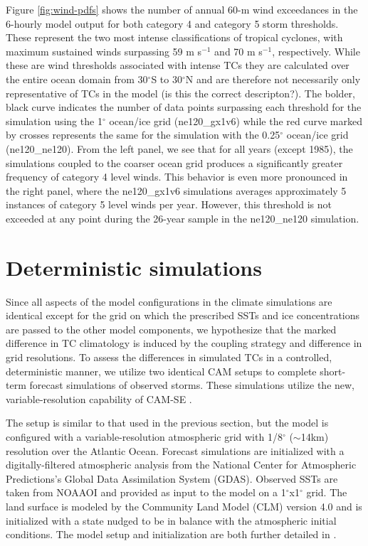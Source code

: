 \documentclass[draft,ms]{AGUTeX}
\newcommand{\degree}{$^{\circ}$}
\newcommand{\texttilde}{$\sim$}
\begin{document}
\begin{article}
Figure \ref{fig:wind-pdfs} shows the number of annual 60-m wind exceedances in the 6-hourly model output for both category 4 and category 5 storm thresholds. These represent the two most intense classifications of tropical cyclones, with maximum sustained winds surpassing 59 m s$^{-1}$ and 70 m s$^{-1}$, respectively. While these are wind thresholds associated with intense TCs they are calculated over the entire ocean domain from 30\degree{}S to 30\degree{}N and are therefore not necessarily only representative of TCs in the model {\color{red}(is this the correct descripton?)}.  The bolder, black curve indicates the number of data points surpassing each threshold for the simulation using the 1\degree{} ocean/ice grid (ne120\_gx1v6) while the red curve marked by crosses represents the same for the simulation with the 0.25\degree{} ocean/ice grid (ne120\_ne120). From the left panel, we see that for all years (except 1985), the simulations coupled to the coarser ocean grid produces a significantly greater frequency of category 4 level winds. This behavior is even more pronounced in the right panel, where the ne120\_gx1v6 simulations averages approximately 5 instances of category 5 level winds per year. However, this threshold is not exceeded at any point during the 26-year sample in the ne120\_ne120 simulation.


\section{Deterministic simulations}
\label{sec:forecast}

Since all aspects of the model configurations in the climate simulations are identical except for the grid on which the prescribed SSTs and ice concentrations are passed to the other model components, we hypothesize that the marked difference in TC climatology is induced by the coupling strategy and difference in grid resolutions. To assess the differences in simulated TCs in a controlled, deterministic manner, we utilize two identical CAM setups to complete short-term forecast simulations of observed storms. These simulations utilize the new, variable-resolution capability of CAM-SE \citep{Zarzycki2014APE}.

The setup is similar to that used in the previous section, but the model is configured with a variable-resolution atmospheric grid with 1/8\degree{} (\texttilde{}14km) resolution over the Atlantic Ocean. Forecast simulations are initialized with a digitally-filtered atmospheric analysis from the National Center for Atmospheric Predictions's Global Data Assimilation System (GDAS). Observed SSTs are taken from NOAAOI and provided as input to the model on a 1\degree{}x1\degree{} grid. The land surface is modeled by the Community Land Model (CLM) version 4.0 and is initialized with a state nudged to be in balance with the atmospheric initial conditions. The model setup and initialization are both further detailed in \citet{Zarzycki2015TCForecast}.


\end{article}
\end{document}
